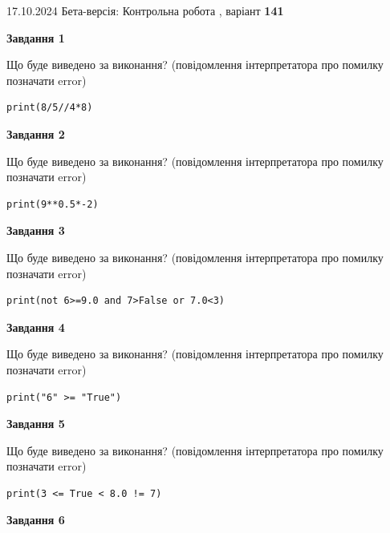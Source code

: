 \documentclass[12pt, ukrainian]{article}
\begin{document}
{\Large{17.10.2024 Бета-версія: Контрольна робота , варіант  \No \textbf { 141 }\par}}
{
\begin {large}
{\begin {center}\textbf{Завдання 1}\end {center}}

Що буде виведено за виконання? (повідомлення інтерпретатора про помилку позначати error)\par
\begin{verbatim}
print(8/5//4*8)
\end{verbatim}

{\begin {center}\textbf{Завдання 2}\end {center}}

Що буде виведено за виконання? (повідомлення інтерпретатора про помилку позначати error)\par
\begin{verbatim}
print(9**0.5*-2)
\end{verbatim}

{\begin {center}\textbf{Завдання 3}\end {center}}

Що буде виведено за виконання? (повідомлення інтерпретатора про помилку позначати error)\par
\begin{verbatim}
print(not 6>=9.0 and 7>False or 7.0<3)
\end{verbatim}

{\begin {center}\textbf{Завдання 4}\end {center}}

Що буде виведено за виконання? (повідомлення інтерпретатора про помилку позначати error)\par
\begin{verbatim}
print("6" >= "True")
\end{verbatim}

{\begin {center}\textbf{Завдання 5}\end {center}}

Що буде виведено за виконання? (повідомлення інтерпретатора про помилку позначати error)\par
\begin{verbatim}
print(3 <= True < 8.0 != 7)
\end{verbatim}

{\begin {center}\textbf{Завдання 6}\end {center}}


\end{large}}
\end{document}
